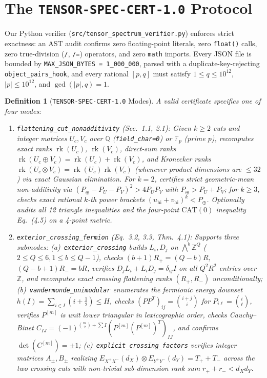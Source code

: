 \documentclass[10pt,twocolumn]{article}
\newtheorem{definition}{Definition}
\begin{document}
\section{The \texttt{TENSOR-SPEC-CERT-1.0} Protocol}
{\raggedright
Our Python verifier (\texttt{src/tensor\_spectrum\_verifier.py}) enforces strict exactness: an AST audit confirms zero floating-point literals, zero \texttt{float()} calls, zero true-division (\texttt{/}, \texttt{/=}) operators, and zero \texttt{math} imports. Every JSON file is bounded by \texttt{MAX\_JSON\_BYTES = 1\_000\_000}, parsed with a duplicate-key-rejecting \texttt{object\_pairs\_hook}, and every rational $[p,q]$ must satisfy $1\le q\le 10^{12}$, $|p|\le 10^{12}$, and $\gcd(|p|,q)=1$.

\begin{definition}[\texttt{TENSOR-SPEC-CERT-1.0} Modes]
A valid certificate specifies one of four modes:
\begin{enumerate}[leftmargin=*,itemsep=1.5pt,topsep=2pt]
\item \texttt{flattening\_cut\_\allowbreak nonadditivity} (Sec.~1.1, 2.1): Given $k\ge 2$ cuts and integer matrices $U_c, V_c$ over $\mathbb{Q}$ (\texttt{field\_char=0}) or $\mathbb{F}_p$ (prime $p$), recomputes exact ranks $\operatorname{rk}(U_c)$, $\operatorname{rk}(V_c)$, direct-sum ranks $\operatorname{rk}(U_c\oplus V_c)=\operatorname{rk}(U_c)+\operatorname{rk}(V_c)$, and Kronecker ranks $\operatorname{rk}(U_c\otimes V_c)=\operatorname{rk}(U_c)\operatorname{rk}(V_c)$ (whenever product dimensions are $\le 32$) via exact Gaussian elimination. For $k=2$, certifies strict geometric-mean non-additivity via $(P_{\oplus}-P_U-P_V)^2 > 4 P_U P_V$ with $P_{\oplus} > P_U + P_V$; for $k\ge 3$, checks exact rational $k$-th power brackets $(u_{\mathrm{hi}}+v_{\mathrm{hi}})^k < P_{\oplus}$. Optionally audits all 12 triangle inequalities and the four-point $\mathrm{CAT}(0)$ inequality Eq.~(4.5) on a 4-point metric.
\item \texttt{exterior\_crossing\_\allowbreak fermion} (Eq.~3.2, 3.3, Thm.~4.1): Supports three submodes: (a)~\texttt{exterior\_crossing} builds $L_i, D_j$ on $\bigwedge^b \mathbb{Z}^Q$ ($2\le Q\le 6, 1\le b\le Q-1$), checks $(b+1)R_+=(Q-b)R$, $(Q-b+1)R_-=bR$, verifies $D_j L_i + L_i D_j = \delta_{ij} I$ on all $Q^2 R^2$ entries over $\mathbb{Z}$, and recomputes exact crossing flattening ranks $(R_+,R_-)$ unconditionally; (b)~\texttt{vandermonde\_unimodular} enumerates the fermionic energy downset $h(I)=\sum_{i\in I}(i+\frac{1}{2})\le H$, checks $(P P^T)_{ij}=\binom{i+j}{i}$ for $P_{i\ell}=\binom{i}{\ell}$, verifies $P^{[m]}$ is unit lower triangular in lexicographic order, checks Cauchy--Binet $C_{IJ} = (-1)^{\binom{m}{2}+\sum I}(P^{[m]}(P^{[m]})^T)_{IJ}$, and confirms $\det(C^{[m]})=\pm 1$; (c)~\texttt{explicit\_crossing\_factors} verifies integer matrices $A_\pm, B_\pm$ realizing $E_{X^+X^-}(d_X)\otimes E_{Y^+Y^-}(d_Y)=T_+ + T_-$ across the two crossing cuts with non-trivial sub-dimension rank sum $r_+ + r_- < d_X d_Y$.

\end{enumerate}
\end{definition}}
\end{document}
